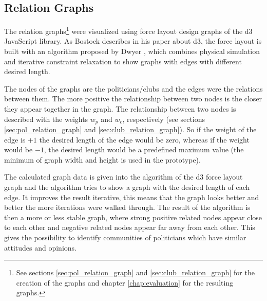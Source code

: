 \subsection{Relation Graphs}
The relation graphs\footnote{See sections \ref{sec:pol_relation_graph} and \ref{sec:club_relation_graph} for the creation of the graphs and chapter \ref{chap:evaluation} for the resulting graphs.} were visualized using force layout design graphs of the d3 JavaScript library. As Bostock \cite{d3_2011} describes in his paper about d3, the force layout is built with an algorithm proposed by Dwyer \cite{Dwyer_2009}, which combines physical simulation and iterative constraint relaxation to show graphs with edges with different desired length. 

The nodes of the graphs are the politicians/clubs and the edges were the relations between them. The more positive the relationship between two nodes is the closer they appear together in the graph. The relationship between two nodes is described with the weights $w_p$ and $w_c$, respectively (see sections \ref{sec:pol_relation_graph} and \ref{sec:club_relation_graph}). So if the weight of the edge is $+1$ the desired length of the edge would be zero, whereas if the weight would be $-1$, the desired length would be a predefined maximum value (the minimum of graph width and height is used in the prototype).

The calculated graph data is given into the algorithm of the d3 force layout graph and the algorithm tries to show a graph with the desired length of each edge. It improves the result iterative, this means that the graph looks better and better the more iterations were walked through. The result of the algorithm is then a more or less stable graph, where strong positive related nodes appear close to each other and negative related nodes appear far away from each other. This gives the possibility to identify communities of politicians which have similar attitudes and opinions.

